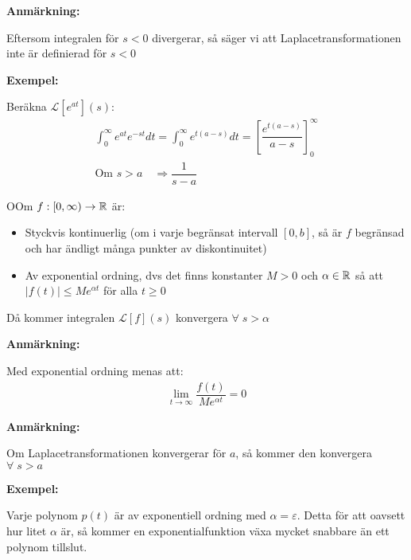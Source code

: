 \par\bigskip
\noindent\textbf{Anmärkning:}\par
\noindent Eftersom integralen för $s<0$ divergerar, så säger vi att Laplacetransformationen inte är definierad för $s<0$
\par\bigskip
\noindent\textbf{Exempel:}\par
\noindent Beräkna $\mathcal{L}[e^{at}](s)$:
\begin{equation*}
  \begin{gathered}
    \int_{0}^{\infty}e^{at}e^{-st}dt = \int_{0}^{\infty}e^{t(a-s)}dt = \left[\dfrac{e^{t(a-s)}}{a-s}\right]_0^\infty\\
    \text{Om } s>a\quad\Rightarrow\dfrac{1}{s-a}
  \end{gathered}
\end{equation*}
\par\bigskip
\begin{theo}
  OOm $f:[0,\infty)\to\mathbb{R}$ är:\par
  \begin{itemize}
    \item Styckvis kontinuerlig (om i varje begränsat intervall $[0,b]$, så är $f$ begränsad och har ändligt många punkter av diskontinuitet)
      \par\bigskip
    \item Av exponential ordning, dvs det finns konstanter $M>0$ och $\alpha\in\mathbb{R}$ så att $\left|f(t)\right|\leq Me^{\alpha t}$ för alla $t\geq0$
  \end{itemize}
  \par\bigskip
  \noindent Då kommer integralen $\mathcal{L}[f](s)$ konvergera $\forall\;s>\alpha$
\end{theo}
\par\bigskip
\noindent\textbf{Anmärkning:}\par
\noindent Med exponential ordning menas att:
\begin{equation*}
  \begin{gathered}
    \lim_{t\to\infty}\dfrac{f(t)}{Me^{\alpha t}} = 0
  \end{gathered}
\end{equation*}
\par\bigskip
\noindent\textbf{Anmärkning:}\par
\noindent Om Laplacetransformationen konvergerar för $a$, så kommer den konvergera $\forall\;s>a$
\par\bigskip
\noindent\textbf{Exempel:}\par
\noindent Varje polynom $p(t)$ är av exponentiell ordning med $\alpha=\varepsilon$. Detta för att oavsett hur litet $\alpha$ är, så kommer en exponentialfunktion växa mycket snabbare än ett polynom tillslut. 
